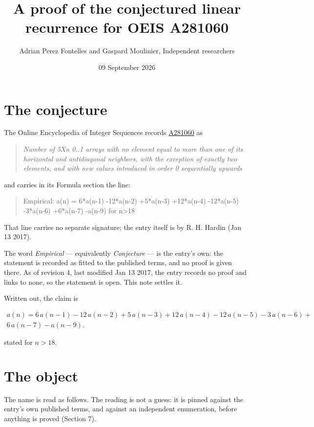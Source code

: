 \documentclass[11pt]{article}
\title{A proof of the conjectured linear recurrence for OEIS A281060}
\author{Adrian Perez Fontelles and Gaspard Moulinier, Independent researchers}
\date{09 September 2026}
\theoremstyle{definition}
\begin{document}
\maketitle
\section{The conjecture}

The Online Encyclopedia of Integer Sequences records \href{https://oeis.org/A281060}{A281060} as

\begin{quote}\itshape Number of 5Xn 0..1 arrays with no element equal to more than one of its horizontal and antidiagonal neighbors, with the exception of exactly two elements, and with new values introduced in order 0 sequentially upwards\end{quote}

and carries in its Formula section the line:

\begin{quote}\ttfamily Empirical: a(n) = 6*a(n-1) -12*a(n-2) +5*a(n-3) +12*a(n-4) -12*a(n-5) -3*a(n-6) +6*a(n-7) -a(n-9) for n>18\end{quote}

That line carries no separate signature; the entry itself is by R. H. Hardin (Jan 13 2017).

The word {\itshape Empirical} --- equivalently {\itshape Conjecture} --- is the entry's own: the statement is recorded as fitted to the published terms, and no proof is given there. As of revision 4, last modified Jan 13 2017, the entry records no proof and links to none, so the statement is open. This note settles it.

Written out, the claim is

\begin{multline*} a(n) = 6\,a(n-1) - 12\,a(n-2) + 5\,a(n-3) + 12\,a(n-4) - 12\,a(n-5) - 3\,a(n-6) + \\ 6\,a(n-7) - a(n-9). \end{multline*}

stated for $n > 18$.

\section{The object}

The name is read as follows. The reading is not a guess: it is pinned against the entry's own published terms, and against an independent enumeration, before anything is proved (Section 7).
\end{document}

